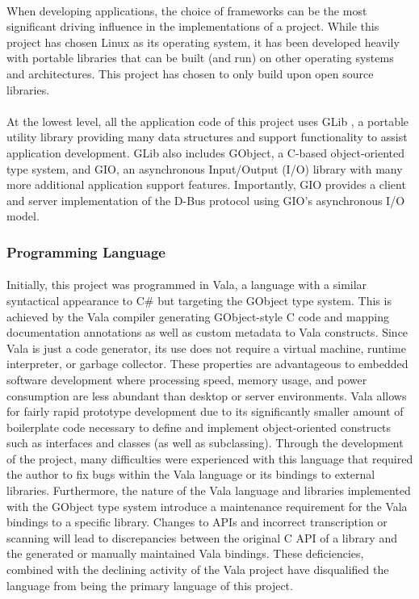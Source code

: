 \paragraph{}
When developing applications, the choice of frameworks can be the most significant driving influence in the implementations of a project.
While this project has chosen Linux as its operating system, it has been developed heavily with portable libraries that can be built (and run) on other operating systems and architectures.
This project has chosen to only build upon open source libraries.

\paragraph{}
At the lowest level, all the application code of this project uses GLib \cite{glib-overview}, a portable utility library providing many data structures and support functionality to assist application development.
GLib also includes GObject, a C-based object-oriented type system, and GIO, an asynchronous Input/Output (I/O) library with many more additional application support features.
Importantly, GIO provides a client and server implementation of the D-Bus protocol using GIO's asynchronous I/O model.

\subsubsection{Programming Language}

\paragraph{}
Initially, this project was programmed in Vala, a language with a similar syntactical appearance to C\# but targeting the GObject type system.
This is achieved by the Vala compiler generating GObject-style C code and mapping documentation annotations as well as custom metadata to Vala constructs.
Since Vala is just a code generator, its use does not require a virtual machine, runtime interpreter, or garbage collector.
These properties are advantageous to embedded software development where processing speed, memory usage, and power consumption are less abundant than desktop or server environments.
Vala allows for fairly rapid prototype development due to its significantly smaller amount of boilerplate code necessary to define and implement object-oriented constructs such as interfaces and classes (as well as subclassing).
Through the development of the project, many difficulties were experienced with this language that required the author to fix bugs within the Vala language or its bindings to external libraries.
Furthermore, the nature of the Vala language and libraries implemented with the GObject type system introduce a maintenance requirement for the Vala bindings to a specific library.
Changes to APIs and incorrect transcription or scanning will lead to discrepancies between the original C API of a library and the generated or manually maintained Vala bindings.
These deficiencies, combined with the declining activity of the Vala project have disqualified the language from being the primary language of this project.

